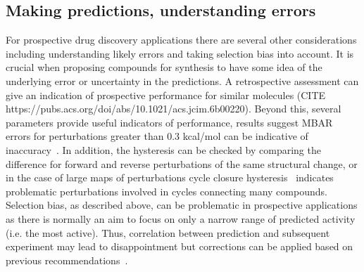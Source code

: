 \documentclass[9pt,bestpractices]{livecoms}
\begin{document}
\subsection{Making predictions, understanding errors}
For prospective drug discovery applications there are several other considerations including understanding likely errors and taking selection bias into account. It is crucial when proposing compounds for synthesis to have some idea of the underlying error or uncertainty in the predictions. A retrospective assessment can give an indication of prospective performance for similar molecules (CITE https://pubs.acs.org/doi/abs/10.1021/acs.jcim.6b00220). Beyond this, several parameters provide useful indicators of performance, results suggest MBAR errors for perturbations greater than 0.3 kcal/mol can be indicative of inaccuracy~\cite{perez-benito2019predicting}. In addition, the hysteresis can be checked by comparing the difference for forward and reverse perturbations of the same structural change, or in the case of large maps of perturbations cycle closure hysteresis~\cite{wang2013modeling} indicates problematic perturbations involved in cycles connecting many compounds. Selection bias, as described above, can be problematic in prospective applications as there is normally an aim to focus on only a narrow range of predicted activity (i.e. the most active). Thus, correlation between prediction and subsequent experiment may lead to disappointment but corrections can be applied based on previous recommendations~\cite{abel2017critical}. 
%
\end{document}
